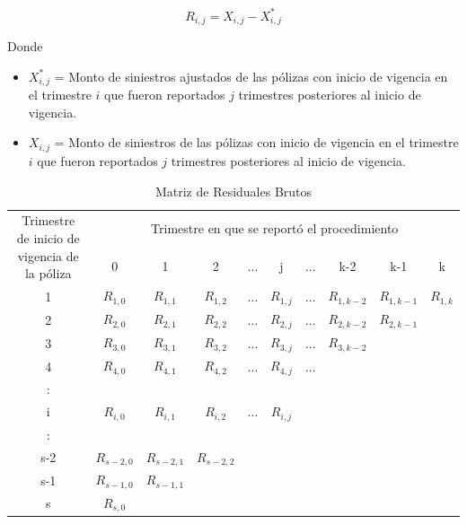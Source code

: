 \documentclass[11pt,twoside,openright,spanish]{report}
\numberwithin{equation}{chapter}
\numberwithin{figure}{chapter}
\numberwithin{table}{chapter}
\begin{document}
	\begin{equation}
	R_{i,j}^{}= X_{i,j}^{} - X_{i,j}^{*} 
	\label{eq7}
	\end{equation}
	
	Donde 
	
	\begin{itemize}
			\setlength\itemsep{-0.5em}
		\item ${X}_{i,j}^{*}$ = Monto de siniestros ajustados de las pólizas con inicio de vigencia en el trimestre $i$ que fueron reportados $j$ trimestres posteriores al inicio de vigencia.
		\item ${X}_{i,j}$ = Monto de siniestros de las pólizas con inicio de vigencia en el trimestre $i$ que fueron reportados $j$ trimestres posteriores al inicio de vigencia.		
		\end{itemize}
		

	\begin{table}[ht]
		\centering
		\begin{tabularx}{\linewidth}{ c|ccccccccc}
			\multirow{2}{4cm}{Trimestre de inicio de vigencia de la póliza}
			& \multicolumn{9}{c}{Trimestre en que se reportó el procedimiento} \\
			& 0  & 1 & 2 & $ \dots $ & j & $\dots $ & k-2 & k-1 &  k \\
			\midrule
			1      &  $R_{1,0}^{ }$ & $R_{1,1}^{ }$ & $R_{1,2}^{ }$ & $ \dots $ & $R_{1,j}^{ }$ & $ \dots $ & $R_{1,k-2}^{ }$ & $R_{1,k-1}^{ }$ & $R_{1,k}^{ }$ \\
			2      &  $R_{2,0}^{ }$ & $R_{2,1}^{ }$ & $R_{2,2}^{ }$ & $ \dots $ & $R_{2,j}^{ }$ & $ \dots $ & $R_{2,k-2}^{ }$ & $R_{2,k-1}^{ }$ & \\
			3      &  $R_{3,0}^{ }$ & $R_{3,1}^{ }$ & $R_{3,2}^{ }$ & $ \dots $ & $R_{3,j}^{ }$ & $ \dots $ & $R_{3,k-2}^{ }$ & & \\
			4      &  $R_{4,0}^{ }$ & $R_{4,1}^{ }$ & $R_{4,2}^{ }$ & $ \dots $ & $R_{4,j}^{ }$ & $ \dots $ & & & \\
			:      & & & & & & & & & \\
			i      &  $R_{i,0}^{ }$ & $R_{i,1}^{ }$ & $R_{i,2}^{ }$ & $ \dots $ & $R_{i,j}^{ }$ & & & & \\
			:      & & & & & & & & & \\
			s-2      &  $R_{s-2,0}^{ }$ & $R_{s-2,1}^{ }$ & $R_{s-2,2}^{ }$ & & & & & & \\
			s-1      &  $R_{s-1,0}^{ }$ & $R_{s-1,1}^{ }$ & & & & & & & \\
			s      &  $R_{s,0}^{ }$ & & & & & & & & \\
		\end{tabularx}
	\caption{Matriz de Residuales Brutos}
	\label{matrix5}
	\end{table}
 
\end{document}
